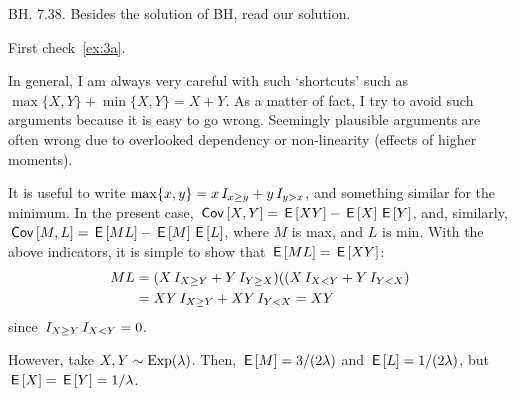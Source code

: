\begin{exercise}
BH. 7.38. Besides the solution of BH, read our solution.
\begin{solution}
First check~\cref{ex:3a}.

In general, I am always very careful with such `shortcuts' such as $\max\{X,Y\} + \min\{X, Y\} = X +Y$.  As a matter of fact, I try to avoid such arguments because it is easy to go wrong. Seemingly plausible arguments are often wrong due to overlooked dependency or non-linearity (effects of higher moments).

It is useful to write $\max\{x,y\} = x\,I_{x\geq y}+y\,I_{y>x}$, and something similar for the minimum. In the present case, $\,\mathsf{Cov}\left[X,Y\right] = \,\mathsf{E}\left[X Y\right]-\,\mathsf{E}\left[X\right] \,\mathsf{E}\left[Y\right]$, and, similarly, $\,\mathsf{Cov}\left[M,L\right] = \,\mathsf{E}\left[ML\right]- \,\mathsf{E}\left[M\right] \,\mathsf{E}\left[L\right]$, where $M$ is max, and $L$ is min. With the above indicators, it is simple to show that $\,\mathsf{E}\left[ML\right] = \,\mathsf{E}\left[X Y\right]$:
\begin{align*}
 ML
  &= (X\,I_{X\geq Y} + Y\,I_{Y\geq X})((X\,I_{X<Y} + Y\,I_{Y<X}) \\
  &= XY\,I_{X\geq Y} + XY\,I_{Y<X} = XY
\end{align*}
since $\,I_{X\geq Y}\,I_{X<Y} =0$.

However, take $X,Y\sim \mathrm{Exp}(\lambda)$. Then, $\,\mathsf{E}\left[M\right] = 3/(2\lambda)$ and $\,\mathsf{E}\left[L\right]= 1/(2\lambda)$, but $\,\mathsf{E}\left[X\right] = \,\mathsf{E}\left[Y\right] = 1/\lambda$.
\end{solution}
\end{exercise}

